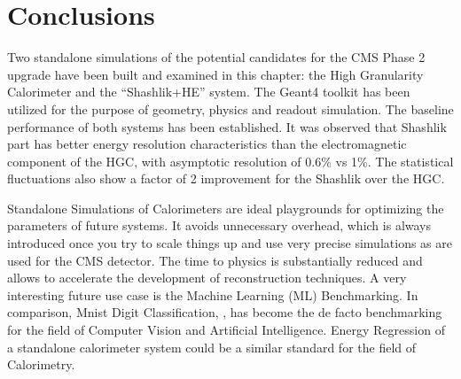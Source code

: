 \section{Conclusions} \label{section:simulations_conclusions}
Two standalone simulations of the potential candidates for the CMS Phase 2 upgrade have been built and examined in this chapter: the High Granularity Calorimeter and the ``Shashlik+HE'' system. The {\sc Geant4} toolkit has been utilized for the purpose of geometry, physics and readout simulation. The baseline performance of both systems has been established. It was observed that Shashlik part has better energy resolution characteristics than the electromagnetic component of the HGC, with asymptotic resolution of 0.6\% vs 1\%. The statistical fluctuations also show a factor of 2 improvement for the Shashlik over the HGC.

Standalone Simulations of Calorimeters are ideal playgrounds for optimizing the parameters of future systems. It avoids unnecessary overhead, which is always introduced once you try to scale things up and use very precise simulations as are used for the CMS detector. The time to physics is substantially reduced and allows to accelerate the development of reconstruction techniques. A very interesting future use case is the Machine Learning (ML) Benchmarking. In comparison, {\sc Mnist} Digit Classification, \cite{mnist}, has become the de facto benchmarking for the field of Computer Vision and Artificial Intelligence. Energy Regression of a standalone calorimeter system could be a similar standard for the field of Calorimetry.
